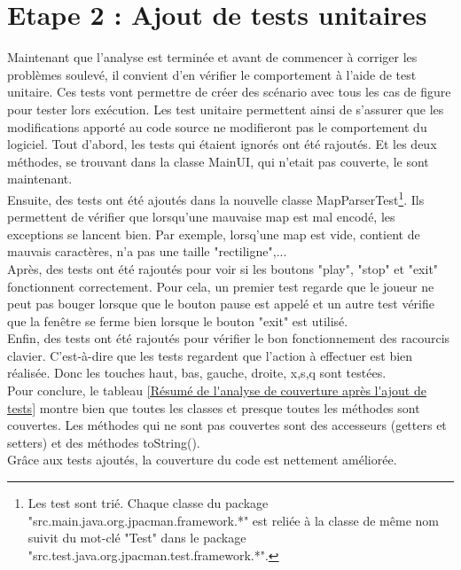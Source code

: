\documentclass[12pt,a4paper,final]{article}
\newcommand{\annexe}[1]{annexe~\ref{#1} (page~\pageref{#1})}
\begin{document}
\section{Etape 2 : Ajout de tests unitaires}\label{sec:etape2}
Maintenant que l'analyse est terminée et avant de commencer à corriger les problèmes soulevé, il convient d'en vérifier le comportement à l'aide de test unitaire. Ces tests vont permettre de créer des scénario avec tous les cas de figure pour tester lors exécution.
Les test unitaire permettent ainsi de s'assurer que les modifications apporté au code source ne modifieront pas le comportement du logiciel.
Tout d'abord, les tests qui étaient ignorés ont été rajoutés. Et les deux méthodes, se trouvant dans la classe MainUI, qui n'etait pas couverte, le sont maintenant.\\
Ensuite, des tests ont été ajoutés dans la nouvelle classe MapParserTest\footnote{Les test sont trié. Chaque classe du package "src.main.java.org.jpacman.framework.*" est reliée à la classe de même nom suivit du mot-clé "Test" dans le package "src.test.java.org.jpacman.test.framework.*".}. Ils permettent de vérifier que lorsqu'une mauvaise map est mal encodé, les exceptions se lancent bien. Par exemple, lorsq'une map est vide, contient de mauvais caractères, n'a pas une taille "rectiligne",...\\
Après, des tests ont été rajoutés pour voir si les boutons "play", "stop" et "exit" fonctionnent correctement. Pour cela, un premier test regarde que le joueur ne peut pas bouger lorsque que le bouton pause est appelé et un autre test vérifie que la fenêtre se ferme bien lorsque le bouton "exit" est utilisé.\\
Enfin, des tests ont été rajoutés pour vérifier le bon fonctionnement des racourcis clavier. C'est-à-dire que les tests regardent que l'action à effectuer est bien réalisée. Donc les touches haut, bas, gauche, droite, x,s,q sont testées.\\
Pour conclure, le tableau \ref{Résumé de l'analyse de couverture après l'ajout de tests} montre bien que toutes les classes et presque toutes les méthodes sont couvertes. Les méthodes qui ne sont pas couvertes sont des accesseurs (getters et setters) et des méthodes toString().\\
Grâce aux tests ajoutés, la couverture du code est nettement améliorée.\\
\end{document}
